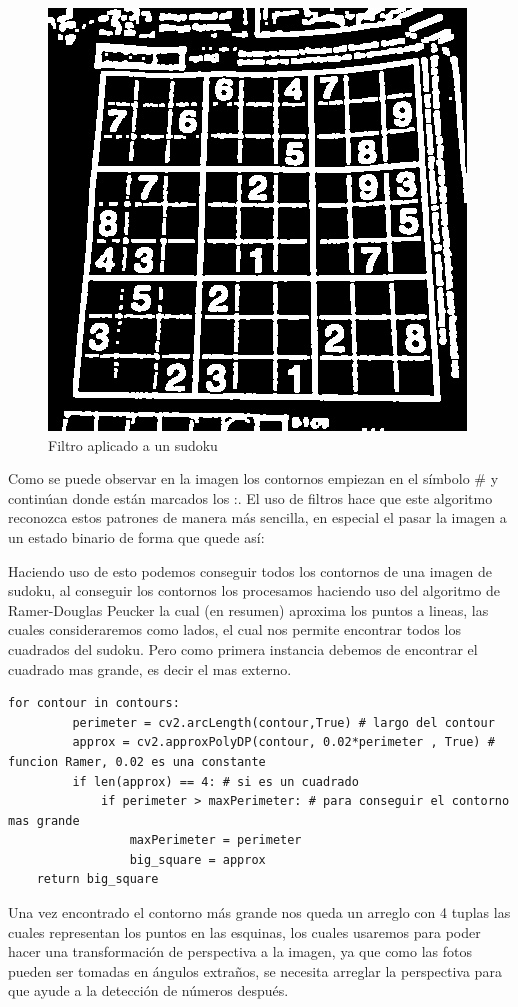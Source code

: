\documentclass{article}
\begin{document}
\begin{figure}
\includegraphics[width=1\linewidth]{filtro}
\caption{Filtro aplicado a un sudoku}
\end{figure}
Como se puede observar en la imagen los contornos empiezan en el símbolo \# y contin\'uan donde est\'an marcados los
:. El uso de filtros hace que este algoritmo reconozca estos patrones de manera m\'as sencilla, en especial el 
pasar la imagen a un estado binario de forma que quede as\'i:

Haciendo uso de esto podemos conseguir todos los contornos de una imagen de sudoku, al conseguir los contornos
los procesamos haciendo uso del algoritmo de Ramer-Douglas Peucker \cite{ramer} la cual (en resumen) aproxima los puntos
a lineas, las cuales consideraremos como lados, el cual nos permite encontrar todos los cuadrados del sudoku.
Pero como primera instancia debemos de encontrar el cuadrado mas grande, es decir el mas externo.
\vspace{.3cm}
\begin{lstlisting}[style=pythonStyle]
for contour in contours:
         perimeter = cv2.arcLength(contour,True) # largo del contour
         approx = cv2.approxPolyDP(contour, 0.02*perimeter , True) # funcion Ramer, 0.02 es una constante
         if len(approx) == 4: # si es un cuadrado
             if perimeter > maxPerimeter: # para conseguir el contorno mas grande
                 maxPerimeter = perimeter
                 big_square = approx
    return big_square
\end{lstlisting}
Una vez encontrado el contorno m\'as grande nos queda un arreglo con 4 tuplas las cuales representan los puntos
en las esquinas, los cuales usaremos para poder hacer una transformación de perspectiva a la imagen, ya que
como las fotos pueden ser tomadas en \'angulos extra\~nos, se necesita arreglar la perspectiva para que ayude a la
detecci\'on de n\'umeros despu\'es.
\end{document}
